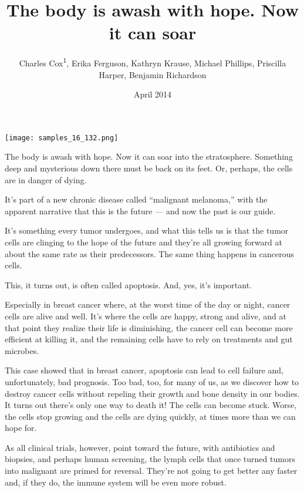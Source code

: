 \documentclass{article}
\title{The body is awash with hope. Now it can soar}
\author{Charles Cox\textsuperscript{1},  Erika Ferguson,  Kathryn Krause,  Michael Phillips,  Priscilla Harper,  Benjamin Richardson}
\affil{\textsuperscript{1}University Hospital Erlangen}
\date{April 2014}
\begin{document}
\maketitle

\begin{center}
\begin{minipage}{0.75\linewidth}
\texttt{[image: samples\_16\_132.png]}
\end{minipage}
\end{center}

The body is awash with hope. Now it can soar into the stratosphere. Something deep and mysterious down there must be back on its feet. Or, perhaps, the cells are in danger of dying.

It’s part of a new chronic disease called “malignant melanoma,” with the apparent narrative that this is the future — and now the past is our guide.

It’s something every tumor undergoes, and what this tells us is that the tumor cells are clinging to the hope of the future and they’re all growing forward at about the same rate as their predecessors. The same thing happens in cancerous cells.

This, it turns out, is often called apoptosis. And, yes, it’s important.

Especially in breast cancer where, at the worst time of the day or night, cancer cells are alive and well. It’s where the cells are happy, strong and alive, and at that point they realize their life is diminishing, the cancer cell can become more efficient at killing it, and the remaining cells have to rely on treatments and gut microbes.

This case showed that in breast cancer, apoptosis can lead to cell failure and, unfortunately, bad prognosis. Too bad, too, for many of us, as we discover how to destroy cancer cells without repeling their growth and bone density in our bodies. It turns out there’s only one way to death it! The cells can become stuck. Worse, the cells stop growing and the cells are dying quickly, at times more than we can hope for.

As all clinical trials, however, point toward the future, with antibiotics and biopsies, and perhaps human screening, the lymph cells that once turned tumors into malignant are primed for reversal. They’re not going to get better any faster and, if they do, the immune system will be even more robust.
\end{document}
